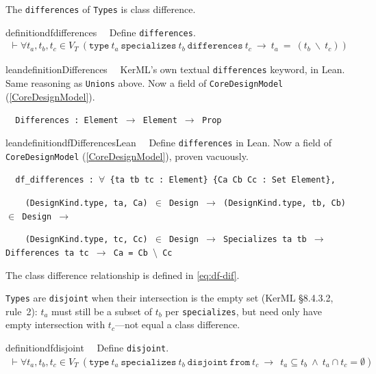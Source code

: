 \pn The \texttt{differences} of \texttt{Types} is class difference.

\begin{restatable}{definition}{dfdifferences}~~ Define \texttt{differences}.
\begin{align}
\vdash \forall t_a , t_b, t_c \in V_T~(\texttt{type}~t_a~\texttt{specializes}~t_b~\texttt{differences}~t_c~ \rightarrow ~t_a~=~(t_b~\backslash~ t_c))~\label{eq:df-differences}\tag{df-differences}
\end{align}
\end{restatable}

\begin{restatable}{leandefinition}{Differences}~~ KerML's own textual \texttt{differences}
keyword, in Lean. Same reasoning as \texttt{Unions} above. Now a field of \texttt{CoreDesignModel}
(\ref{CoreDesignModel}).

\texttt{~~Differences : Element $\to$ Element $\to$ Prop}
\label{Differences}
\end{restatable}

\begin{restatable}{leandefinition}{dfDifferencesLean}~~ Define \texttt{differences} in
Lean. Now a field of \texttt{CoreDesignModel} (\ref{CoreDesignModel}), proven vacuously.

\texttt{~~df\_differences : $\forall$ \{ta tb tc : Element\} \{Ca Cb Cc : Set Element\},}

\texttt{~~~~(DesignKind.type, ta, Ca) $\in$ Design $\to$ (DesignKind.type, tb, Cb) $\in$ Design $\to$}

\texttt{~~~~(DesignKind.type, tc, Cc) $\in$ Design $\to$ Specializes ta tb $\to$ Differences ta tc $\to$ Ca = Cb $\setminus$ Cc}
\label{df_differences}
\end{restatable}

\pn The class difference relationship is defined in \ref{eq:df-dif}.


\pn \texttt{Types} are \texttt{disjoint} when their intersection is the empty set (KerML \S8.4.3.2, rule~2): $t_a$ must still be a subset of $t_b$ per \texttt{specializes}, but need only have empty intersection with $t_c$---not equal a class difference.

\begin{restatable}{definition}{dfdisjoint}~~  Define \texttt{disjoint}.
\begin{align}
\vdash \forall t_a , t_b, t_c  \in V_T~(\texttt{type}~t_a~\texttt{specializes}~t_b~\texttt{disjoint}~\texttt{from}~t_c ~\rightarrow~  ~t_a \subseteq t_b~\wedge~t_a \cap t_c = \emptyset)\label{eq:df-disjoint}\tag{df-disjoint}
\end{align}
\end{restatable}

